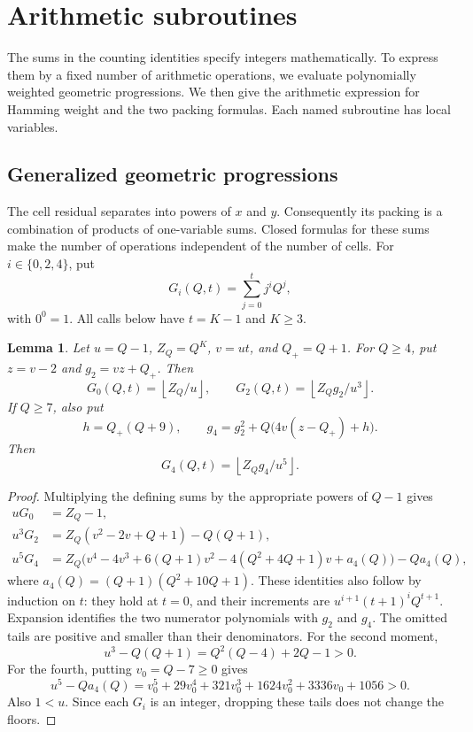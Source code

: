 \documentclass[11pt]{article}
\newtheorem{lemma}[theorem]{Lemma}
\theoremstyle{remark}
\newcommand{\fl}[1]{\left\lfloor #1\right\rfloor}
\begin{document}
\section{Arithmetic subroutines}\label{sec:arithmetic}

The sums in the counting identities specify integers mathematically.
To express them by a fixed number of arithmetic operations, we evaluate
polynomially weighted geometric progressions. We then give the arithmetic
expression for Hamming weight and the two packing formulas.
Each named subroutine has local variables.

\subsection{Generalized geometric progressions}

The cell residual separates into powers of $x$ and $y$. Consequently its
packing is a combination of products of one-variable sums. Closed formulas
for these sums make the number of operations independent of the number
of cells. For $i\in\{0,2,4\}$, put
\[
  G_i(Q,t)=\sum_{j=0}^t j^iQ^j,
\]
with $0^0=1$. All calls below have $t=K-1$ and $K\ge3$.

\begin{lemma}\label{lem:moments}
Let $u=Q-1$, $Z_Q=Q^K$, $v=ut$, and $Q_+=Q+1$.
For $Q\ge4$, put $z=v-2$ and $g_2=vz+Q_+$. Then
\begin{equation}\label{eq:moments-pair}
  G_0(Q,t)=\fl{Z_Q/u},\qquad
  G_2(Q,t)=\fl{Z_Qg_2/u^3}.
\end{equation}
If $Q\ge7$, also put
\[
  h=Q_+(Q+9),\qquad
  g_4=g_2^2+Q\bigl(4v(z-Q_+)+h\bigr).
\]
Then
\begin{equation}\label{eq:moment-four}
  G_4(Q,t)=\fl{Z_Qg_4/u^5}.
\end{equation}
\end{lemma}

\begin{proof}
Multiplying the defining sums by the appropriate powers of $Q-1$ gives
\begin{align*}
  uG_0&=Z_Q-1,\\
  u^3G_2&=Z_Q(v^2-2v+Q+1)-Q(Q+1),\\
  u^5G_4&=Z_Q\bigl(v^4-4v^3+6(Q+1)v^2
            -4(Q^2+4Q+1)v+a_4(Q)\bigr)-Qa_4(Q),
\end{align*}
where $a_4(Q)=(Q+1)(Q^2+10Q+1)$.
These identities also follow by induction on $t$: they hold at $t=0$,
and their increments are $u^{i+1}(t+1)^iQ^{t+1}$.
Expansion identifies the two numerator polynomials with $g_2$ and $g_4$.
The omitted tails are positive and smaller than their denominators.
For the second moment,
\[
  u^3-Q(Q+1)=Q^2(Q-4)+2Q-1>0.
\]
For the fourth, putting $v_0=Q-7\ge0$ gives
\[
  u^5-Qa_4(Q)=v_0^5+29v_0^4+321v_0^3+1624v_0^2+3336v_0+1056>0.
\]
Also $1<u$. Since each $G_i$ is an integer, dropping these tails
does not change the floors.
\end{proof}
\end{document}
